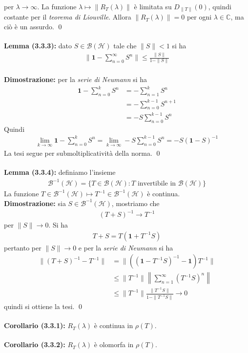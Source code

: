 \documentclass{article}
\numberwithin{equation}{subsection}
\begin{document}
per $\lambda \rightarrow \infty$. La funzione $\lambda \mapsto \|R_T(\lambda)\|$ è limitata su $D_{\|T\|}(0)$, quindi costante per il \textit{teorema di Liouville}. Allora $\|R_T(\lambda)\| = 0$ per ogni $\lambda \in \mathbb{C}$, ma ciò è un assurdo. \qed \\ \\
\textbf{Lemma (3.3.3):} dato $S \in \mathcal{B}(\mathcal{H})$ tale che $\|S\| < 1$ si ha 
\begin{align*}
    \|\mathbf{1} - \sum_{n = 0}^\infty S^n\| \leq \frac{\|S\|}{1 - \|S\|} 
\end{align*} \\

\textbf{Dimostrazione:} per la \textit{serie di Neumann} si ha 
\begin{align*}
    \mathbf{1} - \sum_{n = 0}^k S^n &= -\sum_{n = 1}^k S^n  \\
    &= -\sum_{n = 0}^{k - 1} S^{n + 1}  \\
    &= -S\sum_{n = 0}^{k - 1} S^n
\end{align*}
Quindi
\begin{align*}
    \lim_{k \rightarrow \infty} \mathbf{1} - \sum_{n = 0}^k S^n = \lim_{k \rightarrow \infty} -S\sum_{n = 0}^{k - 1}S^n = -S(\mathbf{1} - S)^{-1}
\end{align*}
La tesi segue per submoltiplicatività della norma. \qed \\ \\
\textbf{Lemma (3.3.4):} definiamo l'insieme 
\begin{align*}
    \mathcal{B}^{-1}(\mathcal{H}) = \{T \in \mathcal{B}(\mathcal{H}) : T \text{ invertibile in } \mathcal{B}(\mathcal{H})\} 
\end{align*}
La funzione $T \in \mathcal{B}^{-1}(\mathcal{H}) \mapsto T^{-1} \in \mathcal{B}^{-1}(\mathcal{H})$ è continua. \\

\textbf{Dimostrazione:} sia $S \in \mathcal{B}^{-1}(\mathcal{H})$, mostriamo che 
\begin{align*}
    (T + S)^{-1} \rightarrow T^{-1} 
\end{align*}
per $\|S \| \rightarrow 0$. Si ha 
\begin{align*}
    T + S = T(\mathbf{1} + T^{-1}S) 
\end{align*}
pertanto per $\|S\| \rightarrow 0$ e per la \textit{serie di Neumann} si ha
\begin{align*}
    \|(T + S)^{-1} - T^{-1}\| &= \|((\mathbf{1} - T^{-1}S)^{-1} - \mathbf{1})T^{-1}\|  \\
    &\leq \|T^{-1}\|\left\|\sum_{n = 1}^\infty (T^{-1}S)^n\right\|  \\
    &\leq \|T^{-1}\|\frac{\|T^{-1}S\|}{1 - \|T^{-1}S\|} \rightarrow 0 
\end{align*}
quindi si ottiene la tesi. \qed \\ \\
\textbf{Corollario (3.3.1):} $R_T(\lambda)$ è continua in $\rho(T)$. \\ \\
\textbf{Corollario (3.3.2):} $R_T(\lambda)$ è olomorfa in $\rho(T)$. \\
\end{document}
